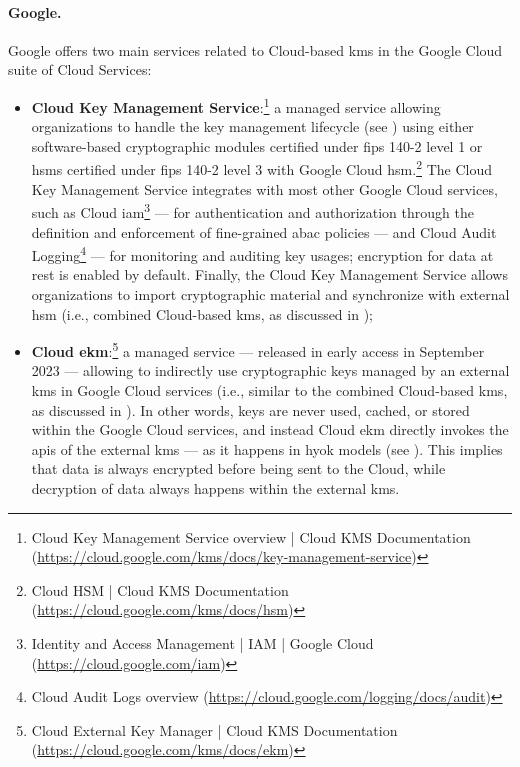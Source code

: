 \paragraph*{Google.}

Google offers two main services related to Cloud-based \gls{kms} in the Google Cloud suite of Cloud Services:

\begin{itemize}
	\item \textbf{Cloud Key Management Service}:\footnote{Cloud Key Management Service overview | Cloud KMS Documentation (\url{https://cloud.google.com/kms/docs/key-management-service})} a managed service allowing organizations to handle the key management lifecycle (see ) using either software-based cryptographic modules certified under \gls{fips} 140-2 level 1 or \glspl{hsm} certified under \gls{fips} 140-2 level 3 with Google Cloud \gls{hsm}.\footnote{Cloud HSM | Cloud KMS Documentation (\url{https://cloud.google.com/kms/docs/hsm})} The Cloud Key Management Service integrates with most other Google Cloud services, such as Cloud \gls{iam}\footnote{Identity and Access Management | IAM | Google Cloud (\url{https://cloud.google.com/iam})} --- for authentication and authorization through the definition and enforcement of fine-grained \gls{abac} policies --- and Cloud Audit Logging\footnote{Cloud Audit Logs overview (\url{https://cloud.google.com/logging/docs/audit})} --- for monitoring and auditing key usages; encryption for data at rest is enabled by default. Finally, the Cloud Key Management Service allows organizations to import cryptographic material and synchronize with external \gls{hsm} (i.e., combined Cloud-based \gls{kms}, as discussed in );
	\item \textbf{Cloud \gls{ekm}}:\footnote{Cloud External Key Manager | Cloud KMS Documentation (\url{https://cloud.google.com/kms/docs/ekm})} a managed service --- released in early access in September 2023 --- allowing to indirectly use cryptographic keys managed by an external \gls{kms} in Google Cloud services (i.e., similar to the combined Cloud-based \gls{kms}, as discussed in ). In other words, keys are never used, cached, or stored within the Google Cloud services, and instead Cloud \gls{ekm} directly invokes the \glspl{api} of the external \gls{kms} --- as it happens in \gls{hyok} models (see ). This implies that data is always encrypted before being sent to the Cloud, while decryption of data always happens within the external \gls{kms}.
\end{itemize}


